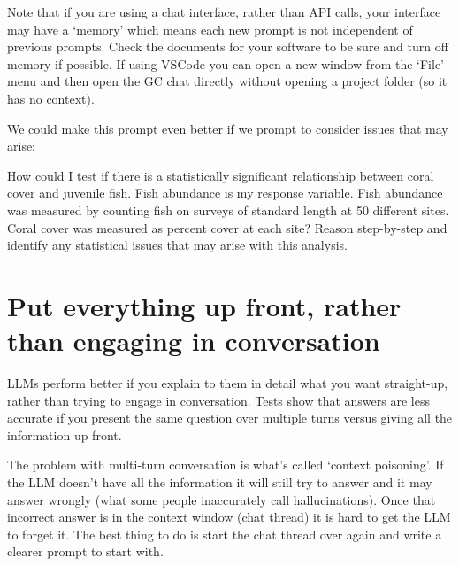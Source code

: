 \documentclass[
  letterpaper,
  DIV=11,
  numbers=noendperiod]{scrreprt}
\begin{document}
Note that if you are using a chat interface, rather than API calls, your
interface may have a `memory' which means each new prompt is not
independent of previous prompts. Check the documents for your software
to be sure and turn off memory if possible. If using VSCode you can open
a new window from the `File' menu and then open the GC chat directly
without opening a project folder (so it has no context).

We could make this prompt even better if we prompt to consider issues
that may arise:

\begin{tcolorbox}[enhanced jigsaw, coltitle=black, breakable, toptitle=1mm, titlerule=0mm, bottomtitle=1mm, colframe=quarto-callout-note-color-frame, left=2mm, leftrule=.75mm, title=\textcolor{quarto-callout-note-color}{\faInfo}\hspace{0.5em}{Note}, opacityback=0, colback=white, opacitybacktitle=0.6, bottomrule=.15mm, arc=.35mm, rightrule=.15mm, toprule=.15mm, colbacktitle=quarto-callout-note-color!10!white]

How could I test if there is a statistically significant relationship
between coral cover and juvenile fish. Fish abundance is my response
variable. Fish abundance was measured by counting fish on surveys of
standard length at 50 different sites. Coral cover was measured as
percent cover at each site? Reason step-by-step and identify any
statistical issues that may arise with this analysis.

\end{tcolorbox}

\section{Put everything up front, rather than engaging in
conversation}\label{put-everything-up-front-rather-than-engaging-in-conversation}

LLMs perform better if you explain to them in detail what you want
straight-up, rather than trying to engage in conversation. Tests show
that answers are less accurate if you present the same question over
multiple turns versus giving all the information up front.

The problem with multi-turn conversation is what's called `context
poisoning'. If the LLM doesn't have all the information it will still
try to answer and it may answer wrongly (what some people inaccurately
call hallucinations). Once that incorrect answer is in the context
window (chat thread) it is hard to get the LLM to forget it. The best
thing to do is start the chat thread over again and write a clearer
prompt to start with.
\end{document}
